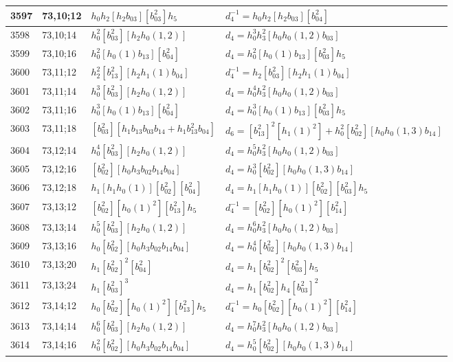 \documentclass{article}
\begin{document}
\begin{longtable}{|l|l|>{\raggedright\arraybackslash}p{6cm}|>{\raggedright\arraybackslash}p{6cm}|}
\hline
3597 & 73,10;12 & $h_0h_2[h_2b_{03}][b_{03}^2]h_5$ & $d_{4}^{-1}=h_0h_2[h_2b_{03}][b_{04}^2]$\\
\hline
3598 & 73,10;14 & $h_0^2[b_{03}^2][h_2h_0(1, 2)]$ &$d_{4}=h_0^3h_3^2[h_0h_0(1, 2)b_{03}]$\\
\hline
3599 & 73,10;16 & $h_0^2[h_0(1)b_{13}][b_{04}^2]$ &$d_{4}=h_0^2[h_0(1)b_{13}][b_{03}^2]h_5$\\
\hline
3600 & 73,11;12 & $h_2^2[b_{13}^2][h_2h_1(1)b_{04}]$ & $d_{4}^{-1}=h_2[b_{03}^2][h_2h_1(1)b_{04}]$\\
\hline
3601 & 73,11;14 & $h_0^3[b_{03}^2][h_2h_0(1, 2)]$ &$d_{4}=h_0^4h_3^2[h_0h_0(1, 2)b_{03}]$\\
\hline
3602 & 73,11;16 & $h_0^3[h_0(1)b_{13}][b_{04}^2]$ &$d_{4}=h_0^3[h_0(1)b_{13}][b_{03}^2]h_5$\\
\hline
3603 & 73,11;18 & $[b_{03}^2][h_1b_{13}b_{03}b_{14} + h_1b_{13}^2b_{04}]$ &$d_{6}=[b_{13}^2]^2[h_1(1)^2] + h_0^2[b_{02}^2][h_0h_0(1, 3)b_{14}]$\\
\hline
3604 & 73,12;14 & $h_0^4[b_{03}^2][h_2h_0(1, 2)]$ &$d_{4}=h_0^5h_3^2[h_0h_0(1, 2)b_{03}]$\\
\hline
3605 & 73,12;16 & $[b_{02}^2][h_0h_3b_{02}b_{14}b_{04}]$ &$d_{4}=h_0^3[b_{02}^2][h_0h_0(1, 3)b_{14}]$\\
\hline
3606 & 73,12;18 & $h_1[h_1h_0(1)][b_{02}^2][b_{04}^2]$ &$d_{4}=h_1[h_1h_0(1)][b_{02}^2][b_{03}^2]h_5$\\
\hline
3607 & 73,13;12 & $[b_{02}^2][h_0(1)^2][b_{13}^2]h_5$ & $d_{4}^{-1}=[b_{02}^2][h_0(1)^2][b_{14}^2]$\\
\hline
3608 & 73,13;14 & $h_0^5[b_{03}^2][h_2h_0(1, 2)]$ &$d_{4}=h_0^6h_3^2[h_0h_0(1, 2)b_{03}]$\\
\hline
3609 & 73,13;16 & $h_0[b_{02}^2][h_0h_3b_{02}b_{14}b_{04}]$ &$d_{4}=h_0^4[b_{02}^2][h_0h_0(1, 3)b_{14}]$\\
\hline
3610 & 73,13;20 & $h_1[b_{02}^2]^2[b_{04}^2]$ &$d_{4}=h_1[b_{02}^2]^2[b_{03}^2]h_5$\\
\hline
3611 & 73,13;24 & $h_1[b_{03}^2]^3$ &$d_{4}=h_1[b_{02}^2]h_4[b_{03}^2]^2$\\
\hline
3612 & 73,14;12 & $h_0[b_{02}^2][h_0(1)^2][b_{13}^2]h_5$ & $d_{4}^{-1}=h_0[b_{02}^2][h_0(1)^2][b_{14}^2]$\\
\hline
3613 & 73,14;14 & $h_0^6[b_{03}^2][h_2h_0(1, 2)]$ &$d_{4}=h_0^7h_3^2[h_0h_0(1, 2)b_{03}]$\\
\hline
3614 & 73,14;16 & $h_0^2[b_{02}^2][h_0h_3b_{02}b_{14}b_{04}]$ &$d_{4}=h_0^5[b_{02}^2][h_0h_0(1, 3)b_{14}]$\\

\end{longtable}
\end{document}
